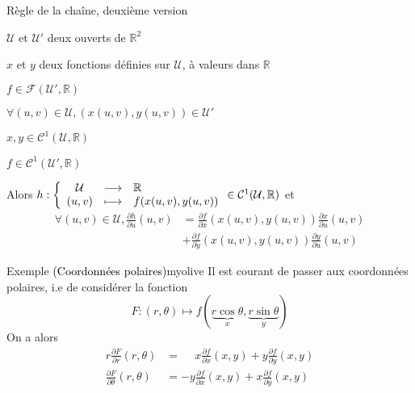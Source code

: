     \begin{prop}{Règle de la chaîne, deuxième version}{}
        \begin{soient}
            \item $\mathcal{U}$ et $\mathcal{U}'$ deux ouverts de $\mathbb{R}^2$
            \item $x$ et $y$ deux fonctions définies sur $\mathcal{U}$, à valeurs dans $\mathbb{R}$
            \item $f \in \mathcal{F}(\mathcal{U}',\mathbb{R})$
        \end{soient}
        \begin{suppose}
            \item $\forall (u,v) \in \mathcal{U}, \left(x(u,v),y(u,v)\right) \in \mathcal{U}'$
            \item $x,y \in \mathcal{C}^1 (\mathcal{U},\mathbb{R})$
            \item $ f \in \mathcal{C}^1 (\mathcal{U}',\mathbb{R})$
        \end{suppose}
        Alors $\fonction{h}{\mathcal{U}}{\mathbb{R}}{(u,v)}{f(x(u,v),y(u,v))} \in \mathcal{C}^1(\mathcal{U},\mathbb{R})$ et 
        \begin{align*}
            \forall (u,v) \in \mathcal{U}, \frac{\partial h}{\partial u}(u,v) &= \frac{\partial f}{\partial x}(x(u,v),y(u,v))\frac{\partial x}{\partial u}(u,v) \\ &+ \frac{\partial f}{\partial y}(x(u,v),y(u,v))\frac{\partial y}{\partial u}(u,v)
        \end{align*}
    \end{prop}

    \begin{omed}{Exemple \textcolor{black}{(Coordonnées polaires)}}{myolive}
        Il est courant de passer aux coordonnées polaires, i.e de considérer la fonction 
        \[ F : (r,\theta) \mapsto f(\underbrace{r \cos \theta}_x,\underbrace{ r \sin \theta}_y) \]
        On a alors 
        \begin{align*}
            r \frac{\partial F}{\partial r}(r,\theta) &= \phantom{-}x \frac{\partial f}{\partial x}(x,y) + y \frac{\partial f}{\partial y}(x,y) \\
            \frac{\partial F}{\partial \theta}(r,\theta) &= -y \frac{\partial f}{\partial x}(x,y) + x \frac{\partial f}{\partial y}(x,y) \\
        \end{align*}
    \end{omed}


